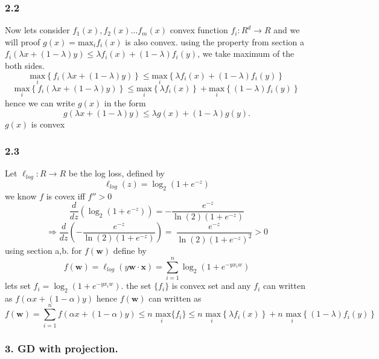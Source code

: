 \documentclass[12pt]{article}
\theoremstyle{plain}
\begin{document}
\subsubsection*{2.2}
Now lets consider $f_1(x),f_2(x)\dots f_m(x)$ convex function $f_i : R^d \rightarrow R$ and we will proof $g(x)=\text{max}_i f_i(x)$ is also convex. using the property from section a $
f_i(\lambda x + (1-\lambda)y) \le \lambda f_i(x) + (1-\lambda)f_i(y)$, we take maximum of the both sides.
\[\underset{i}{\text{max}} \left\{ f_i(\lambda x + (1-\lambda)y) \right\} \le \underset{i}{\text{max}} \left\{ \lambda f_i(x) + (1-\lambda)f_i(y) \right\}
\]
\[\underset{i}{\text{max}} \left\{ f_i(\lambda x + (1-\lambda)y) \right\} \le \underset{i}{\text{max}} \left\{\lambda f_i(x) \right\} + \underset{i}{\text{max}} \left\{(1-\lambda)f_i(y) \right\} 
\]
hence we can write $g(x)$ in the form\[
g(\lambda x + (1-\lambda)y) \le \lambda g(x) + (1-\lambda)g(y).
\]
$g(x)$ is convex 
\subsubsection*{2.3}
Let $\ell_{ log} : R \rightarrow R$ be the log loss, defined by \[
\ell_{ log}(z)=\log_{2} (1+e^{-z})
\]
we know $f$ is covex iff $f''>0$
\[\frac{d}{dz}\left(\log _2\left(1+e^{-z}\right)\right)=-\frac{e^{-z}}{\ln \left(2\right)\left(1+e^{-z}\right)}
\]
\[\Rightarrow \frac{d}{dz} \left(-\frac{e^{-z}}{\ln \left(2\right)\left(1+e^{-z}\right)}\right)=\:\frac{e^{-z}}{\ln \left(2\right)\left(1+e^{-z}\right)^2}>0
\]
using section a,b. for  $f(\mathbf{w})$ define by  
\[
f(\mathbf{w}) = \ell_{log}(y\mathbf{w\cdot x})=\sum_{i=1}^n \log_{2} (1+e^{-yx_iw})
\]
lets set $f_i=\log_{2} (1+e^{-yx_iw})$. the set  $\lbrace f_i \rbrace$ is convex set and any $f_i$  can  written as $f(\alpha x+(1-\alpha)y)$ hence $f(\mathbf{w})$ can written as
\\
\[
f(\mathbf{w}) =\sum_{i=1}^n f (\alpha x+(1-\alpha)y)\leq n\underset{i}{\text{ max}}\{f_i
\}\leq n\underset{i}{\text{ max}} \left\{\lambda f_i(x) \right\} + n\underset{i}{\text{ max}} \left\{(1-\lambda)f_i(y) \right\}
\]
\subsubsection*{ 3.  GD with projection. }
\end{document}
